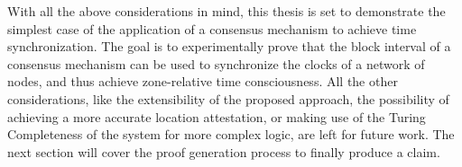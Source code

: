 \newpage
With all the above considerations in mind, this thesis is set to demonstrate the simplest case of the application of a consensus mechanism to achieve time synchronization. The goal is to experimentally prove that the block interval of a consensus mechanism can be used to synchronize  the clocks of a network of nodes, and thus achieve zone-relative time consciousness. All the other considerations, like the extensibility of the proposed approach, the possibility of achieving a more accurate location attestation, or making use of the Turing Completeness of the system for more complex logic, are left for future work. The next section will cover the proof generation process to finally produce a \pol{} claim.